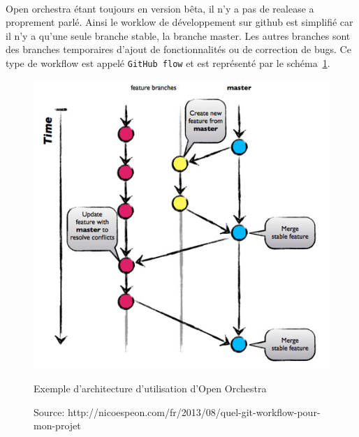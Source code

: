 \paragraph{}
Open orchestra étant toujours en version bêta, il n'y a pas de realease a proprement parlé. Ainsi le worklow de développement sur github est simplifié car il n'y a qu'une seule branche stable, la branche master. Les autres branches sont des branches temporaires d'ajout de fonctionnalités ou de correction de bugs. Ce type de workflow est appelé \verb?GitHub flow? et est représenté par le schéma~\ref{github}.
\begin{figure}[H]
  \begin{center}
    \includegraphics[scale=0.75]{images/github-flow}
  \end{center}
  \caption{Exemple d'architecture d'utilisation d'Open Orchestra}
  \caption*{Source: http://nicoespeon.com/fr/2013/08/quel-git-workflow-pour-mon-projet}
  \label{github}
\end{figure}

